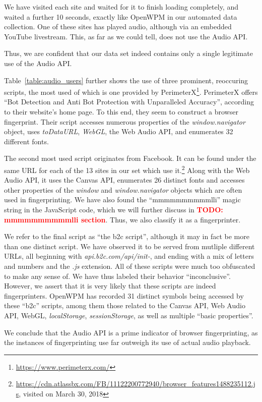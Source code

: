 \documentclass[
    fontsize=12pt,
    headings=small,
    parskip=half,
    bibliography=totoc,
    numbers=noenddot,
    open=any
    ]{scrreprt}
\newcommand{\todo}[1]{\textcolor{red}{\textbf{TODO: #1}}}
\begin{document}
We have visited each site and waited for it to finish loading completely, and waited a further 10 seconds,
exactly like OpenWPM in our automated data collection.
One of these sites has played audio, although via an embedded YouTube livestream.
This, as far as we could tell, does not use the Audio API.

Thus, we are confident that our data set indeed contains only a single legitimate use of
the Audio API.

Table~\ref{table:audio_users} further shows the use of three prominent, reoccuring scripts, the most used
of which is one provided by PerimeterX\footnote{\url{https://www.perimeterx.com/}}.
PerimeterX offers ``Bot Detection and Anti Bot Protection with Unparalleled Accuracy'',
according to their website's home page. To this end, they seem to construct a browser fingerprint.
Their script accesses numerous properties of the \textit{window.navigator} object, uses \textit{toDataURL},
\textit{WebGL}, the Web Audio API, and enumerates 32 different fonts.

The second most used script originates from Facebook. It can be found under the same URL
for each of the 13 sites in our set which use it.\footnote{\url{https://cdn.atlassbx.com/FB/11122200772940/browser_features1488235112.js}, visited on March 30, 2018}
Along with the Web Audio API, it uses the Canvas API, enumerates 26 distinct fonts and accesses other
properties of the \textit{window} and \textit{window.navigator} objects which are often used in fingerprinting.
We have also found the ``mmmmmmmmmmlli'' magic string in the JavaScript code, which we will further discuss
in \todo{mmmmmmmmmmlli section}.
Thus, we also classify it as a fingerprinter.

We refer to the final script as ``the b2c script'', although it may in fact be more than one distinct
script. We have observed it to be served from mutliple different URLs,
all beginning with \textit{api.b2c.com/api/init-}, and ending with a mix of letters and numbers and the \textit{.js} extension.
All of these scripts were much too obfuscated to make any sense of. We have thus labeled their behavior ``inconclusive''.
However, we assert that it is very likely that these scripts are indeed fingerprinters.
OpenWPM has recorded 31 distinct symbols being accessed by these ``b2c'' scripts, among them
those related to the Canvas API, Web Audio API, WebGL, \textit{localStorage}, \textit{sessionStorage},
as well as multiple ``basic properties''.

We conclude that the Audio API is a prime indicator of browser fingerprinting, as the instances of
fingerprinting use far outweigh its use of actual audio playback.
\end{document}
